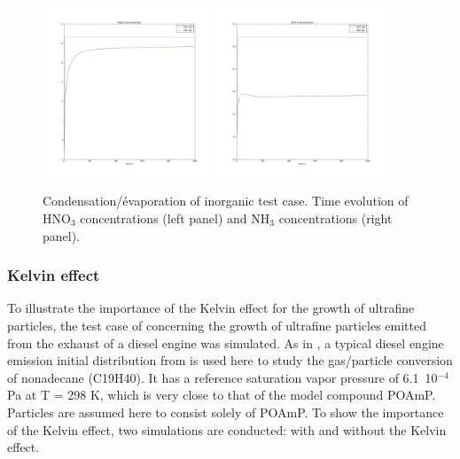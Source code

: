 \documentclass[a4paper,11pt]{article}
\begin{document}
\begin{figure}[H]
        \begin{center}
                \includegraphics[angle=0,width=0.45\textwidth]{../graph/figure_ref/HNO3_COND-EVAP_time.png}
                \includegraphics[angle=0,width=0.45\textwidth]{../graph/figure_ref/NH3_COND-EVAP_time.png}
        \end{center}
\caption{Condensation/\'evaporation of inorganic test case. Time evolution of
  HNO$_3$ concentrations (left panel) and NH$_3$ concentrations (right panel).}
\label{fig-cond-evap}
\end{figure}
       

\subsubsection{Kelvin effect}

To illustrate the importance of the Kelvin effect for the growth of ultrafine
particles, the test case of \cite{devilliers2013new} concerning the growth of
ultrafine particles emitted from the exhaust of a diesel engine was simulated.
As in \cite{devilliers2013new}, a typical diesel engine emission initial
distribution from \cite{kittelson2006road} is used here to
study the gas/particle conversion of nonadecane (C19H40). It has a
reference saturation vapor pressure of 6.1~10$^{-4}$ Pa at T = 298 K, which is
very close to that of the model compound POAmP.
Particles are assumed here to consist solely of POAmP.
To show the importance of the Kelvin effect, two simulations are conducted:
with and without the Kelvin effect.
\end{document}
